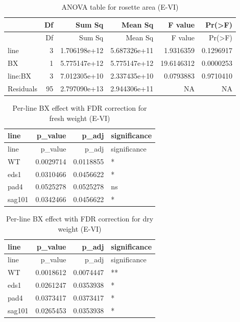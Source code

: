 \documentclass[
  10pt,
]{article}
\begin{document}
\begin{longtable}[]{@{}lrrrrr@{}}
\caption{ANOVA table for rosette area (E-VI)}\tabularnewline
\toprule\noalign{}
& Df & Sum Sq & Mean Sq & F value & Pr(\textgreater F) \\
\midrule\noalign{}
\endfirsthead
\toprule\noalign{}
& Df & Sum Sq & Mean Sq & F value & Pr(\textgreater F) \\
\midrule\noalign{}
\endhead
\bottomrule\noalign{}
\endlastfoot
line & 3 & 1.706198e+12 & 5.687326e+11 & 1.9316359 & 0.1296917 \\
BX & 1 & 5.775147e+12 & 5.775147e+12 & 19.6146312 & 0.0000253 \\
line:BX & 3 & 7.012305e+10 & 2.337435e+10 & 0.0793883 & 0.9710410 \\
Residuals & 95 & 2.797090e+13 & 2.944306e+11 & NA & NA \\
\end{longtable}

\begin{longtable}[]{@{}lrrl@{}}
\caption{Per-line BX effect with FDR correction for fresh weight
(E-VI)}\tabularnewline
\toprule\noalign{}
line & p\_value & p\_adj & significance \\
\midrule\noalign{}
\endfirsthead
\toprule\noalign{}
line & p\_value & p\_adj & significance \\
\midrule\noalign{}
\endhead
\bottomrule\noalign{}
\endlastfoot
WT & 0.0029714 & 0.0118855 & * \\
eds1 & 0.0310466 & 0.0456622 & * \\
pad4 & 0.0525278 & 0.0525278 & ns \\
sag101 & 0.0342466 & 0.0456622 & * \\
\end{longtable}

\begin{longtable}[]{@{}lrrl@{}}
\caption{Per-line BX effect with FDR correction for dry weight
(E-VI)}\tabularnewline
\toprule\noalign{}
line & p\_value & p\_adj & significance \\
\midrule\noalign{}
\endfirsthead
\toprule\noalign{}
line & p\_value & p\_adj & significance \\
\midrule\noalign{}
\endhead
\bottomrule\noalign{}
\endlastfoot
WT & 0.0018612 & 0.0074447 & ** \\
eds1 & 0.0261247 & 0.0353938 & * \\
pad4 & 0.0373417 & 0.0373417 & * \\
sag101 & 0.0265453 & 0.0353938 & * \\
\end{longtable}
\end{document}
